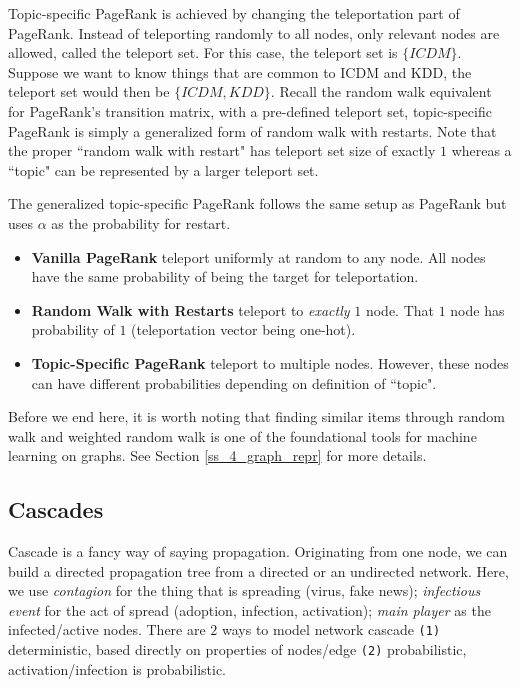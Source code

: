 Topic-specific PageRank is achieved by changing the teleportation part of PageRank. Instead of teleporting randomly to all nodes, only relevant nodes are allowed, called the teleport set. For this case, the teleport set is $\{ICDM\}$. Suppose we want to know things that are common to ICDM and KDD, the teleport set would then be $\{ICDM, KDD\}$. Recall the random walk equivalent for PageRank's transition matrix, with a pre-defined teleport set, topic-specific PageRank is simply a generalized form of random walk with restarts. Note that the proper ``random walk with restart" has teleport set size of exactly $1$ whereas a ``topic" can be represented by a larger teleport set.

The generalized topic-specific PageRank follows the same setup as PageRank but uses $\alpha$ as the probability for restart. 

\begin{itemize}
    \item \textbf{Vanilla PageRank} teleport uniformly at random to any node. All nodes have the same probability of being the target for teleportation.
    
    \item \textbf{Random Walk with Restarts} teleport to \textit{exactly} $1$ node. That $1$ node has probability of $1$ (teleportation vector being one-hot).
    
    \item \textbf{Topic-Specific PageRank} teleport to multiple nodes. However, these nodes can have different probabilities depending on definition of ``topic". 
\end{itemize}{}

Before we end here, it is worth noting that finding similar items through random walk and weighted random walk is one of the foundational tools for machine learning on graphs. See Section \ref{ss_4_graph_repr} for more details.


\subsection{Cascades}

Cascade is a fancy way of saying propagation. Originating from one node, we can build a directed propagation tree from a directed or an undirected network. Here, we use \textit{contagion} for the thing that is spreading (virus, fake news); \textit{infectious event} for the act of spread (adoption, infection, activation); \textit{main player} as the infected/active nodes. There are $2$ ways to model network cascade \texttt{(1)} deterministic, based directly on properties of nodes/edge \texttt{(2)} probabilistic, activation/infection is probabilistic.

